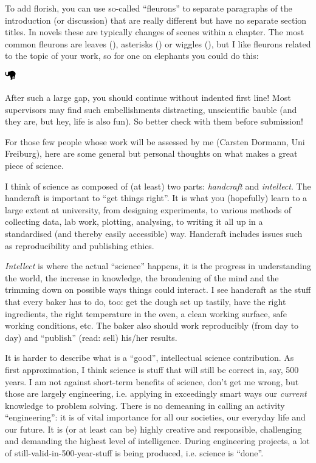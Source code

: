 To add florish, you can use so-called ``fleurons'' to separate paragraphs of the introduction (or discussion) that are really different but have no separate section titles. In novels these are typically changes of scenes within a chapter. The most common fleurons are leaves (\adfhangingflatleafright), asterisks () or wiggles (),
but I like fleurons related to the topic of your work, so for one on elephants you could do this: 

{\centering
	\includegraphics[width=0.5cm]{images/elephant.png}
	
}

\noindent After such a large gap, you should continue without indented first line! Most supervisors may find such embellishments distracting, unscientific bauble (and they are, but hey, life is also fun). So better check with them before submission!

%

\bigskip
\noindent For those few people whose work will be assessed by me (Carsten Dormann, Uni Freiburg), here are some general but personal thoughts on what makes a great piece of science.

I think of science as composed of (at least) two parts: \emph{handcraft} and \emph{intellect}. The handcraft is important to ``get things right''. It is what you (hopefully) learn to a large extent at university, from designing experiments, to various methods of collecting data, lab work, plotting, analysing, to writing it all up in a standardised (and thereby easily accessible) way. Handcraft includes issues such as reproducibility and publishing ethics.

\emph{Intellect} is where the actual ``science'' happens, it is the progress in understanding the world, the increase in knowledge, the broadening of the mind and the trimming down on possible ways things could interact. I see handcraft as the stuff that every baker has to do, too: get the dough set up tastily, have the right ingredients, the right temperature in the oven, a clean working surface, safe working conditions, etc. The baker also should work reproducibly (from day to day) and ``publish'' (read: sell) his/her results.

It is harder to describe what is a ``good'', intellectual science contribution. As first approximation, I think science is stuff that will still be correct in, say, 500 years. I am not against short-term benefits of science, don't get me wrong, but those are largely engineering, i.e. applying in exceedingly smart ways our \emph{current} knowledge to problem solving. There is no demeaning in calling an activity ``engineering'': it is of vital importance for all our societies, our everyday life and our future. It is (or at least can be) highly creative and responsible, challenging and demanding the highest level of intelligence. During engineering projects, a lot of still-valid-in-500-year-stuff is being produced, i.e. science is ``done''. 

